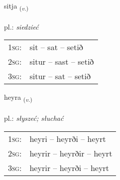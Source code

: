 \documentclass[frontgrid, backgrid]{flacards}\usepackage[]{graphicx}\usepackage[]{xcolor}
\begin{document}
\renewcommand{\flhead}{\vskip5pt \fboxsep=0pt {\small\bfseries\footnotesize Sagnorð | czasownik}}
\renewcommand{\fcfoot}{\vskip5pt \fboxsep=0pt \hspace{2pt}{\small\bfseries\footnotesize 1K}}

\renewcommand{\blhead}{\vskip5pt {\small\bfseries\footnotesize Sagnorð | czasownik }}
\renewcommand{\bcfoot}{\vskip5pt \hspace{2pt}{\small\bfseries\footnotesize 1K}}


{sitja \small{\textsubscript{(\textit{v.})}} \\[1ex] %
\textphonetic{[sɪːtja]} \\
pl.: \emph{siedzieć} \\  [2ex]
\renewcommand*{\arraystretch}{0.8}
\begin{tabular}{p{1cm}l}
\textsc{1sg}: & sit -- sat -- setið \\ 
\textsc{2sg}: & situr -- sast -- setið \\ 
\textsc{3sg}: & situr -- sat -- setið \\ 
\end{tabular}
}

\renewcommand{\flhead}{\vskip5pt \fboxsep=0pt {\small\bfseries\footnotesize Sagnorð | czasownik}}
\renewcommand{\fcfoot}{\vskip5pt \fboxsep=0pt \hspace{2pt}{\small\bfseries\footnotesize 1K}}

\renewcommand{\blhead}{\vskip5pt {\small\bfseries\footnotesize Sagnorð | czasownik }}
\renewcommand{\bcfoot}{\vskip5pt \hspace{2pt}{\small\bfseries\footnotesize 1K}}


{heyra \small{\textsubscript{(\textit{v.})}} \\[1ex] %
\textphonetic{[heiːra]} \\
pl.: \emph{słyszeć; słuchać} \\  [2ex]
\renewcommand*{\arraystretch}{0.8}
\begin{tabular}{p{1cm}l}
\textsc{1sg}: & heyri -- heyrði -- heyrt \\ 
\textsc{2sg}: & heyrir -- heyrðir -- heyrt \\ 
\textsc{3sg}: & heyrir -- heyrði -- heyrt \\ 
\end{tabular}
}
\end{document}
